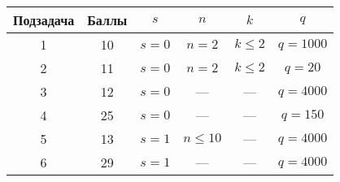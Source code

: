 \newcommand{\gt}{\textgreater} 
\newcommand{\lt}{\textless} 


\begin{center}
\renewcommand{\arraystretch}{1.5}
\begin{tabular}{|c|c|c|c|c|c|}
\hline
Подзадача & Баллы & $s$ & $n$ & $k$ & $q$\\
\hline
1 & 10 & $s=0$ & $n=2$ & $k\leq2$ & $q=1000$ \\
\hline
2 & 11 & $s=0$ & $n=2$ & $k\leq2$ & $q=20$\\
\hline
3 & 12 & $s=0$ & --- & --- & $q=4000$\\
\hline
4 & 25 & $s=0$ & --- & --- & $q=150$ \\
\hline
5 & 13 & $s=1$ & $n \leq 10$ & --- & $q=4000$\\
\hline
6 & 29 & $s=1$ & --- & --- & $q=4000$\\
\hline
\end{tabular}
\end{center}